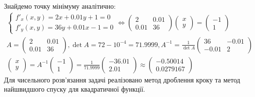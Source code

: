 \documentclass{extreport}
\begin{document}
Знайдемо точку мінімуму аналітично:
\begin{gather*}
    \begin{cases}
        f'_x(x,y) = 2x + 0.01y + 1 = 0 \\
        f'_y(x,y) = 36y + 0.01x - 1 = 0
    \end{cases} \Leftrightarrow
    \begin{pmatrix}
        2 & 0.01 \\
        0.01 & 36
    \end{pmatrix}
    \begin{pmatrix}
        x \\
        y
    \end{pmatrix} = 
    \begin{pmatrix}
        -1 \\
        1
    \end{pmatrix} \\
    A = \begin{pmatrix}
        2 & 0.01 \\
        0.01 & 36
    \end{pmatrix},
    \det{A} = 72 - 10^{-4} = 71.9999, A^{-1} = \frac{1}{\det{A}}
    \begin{pmatrix}
        36 & -0.01 \\
        -0.01 & 2
    \end{pmatrix} \\
    \begin{pmatrix}
        x \\
        y
    \end{pmatrix} = A^{-1} \begin{pmatrix}
        -1 \\
        1
    \end{pmatrix} = \frac{1}{71.9999} 
    \begin{pmatrix}
        -36.01 \\
        2.01
    \end{pmatrix} \approx
    \begin{pmatrix}
        -0.50014 \\
        0.0279167
    \end{pmatrix}
\end{gather*}
Для чисельного розв'язання задачі реалізовано метод дроблення кроку та метод найшвидшого спуску для квадратичної функції.
\end{document}
